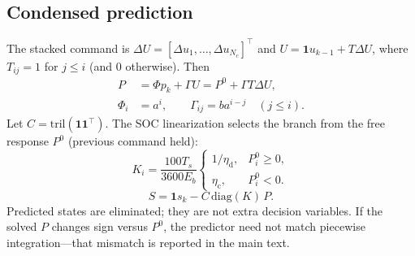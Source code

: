 \documentclass{ieeeaccess}
\begin{document}
\subsection{Condensed prediction}
The stacked command is $\Delta U=[\Delta u_1,\ldots,\Delta u_{N_c}]^\top$ and $U=\mathbf{1}u_{k-1}+T\Delta U$, where $T_{ij}=1$ for $j\le i$ (and $0$ otherwise). Then
\begin{align}
P&=\Phi p_k+\Gamma U=P^{0}+\Gamma T\Delta U,\\
\Phi_i&=a^{i},\qquad
\Gamma_{ij}=b a^{i-j}\quad (j\le i).
\end{align}
Let $C=\mathrm{tril}(\mathbf{1}\mathbf{1}^\top)$. The SOC linearization selects the branch from the free response $P^{0}$ (previous command held):
\begin{equation}
K_i=\frac{100T_s}{3600E_b}
\begin{cases}
1/\eta_{\mathrm{d}}, & P_i^{0}\ge 0,\\
\eta_{\mathrm{c}}, & P_i^{0}<0.
\end{cases}
\end{equation}
\begin{equation}
S=\mathbf{1}s_k-C\,\mathrm{diag}(K)\,P.
\end{equation}
Predicted states are eliminated; they are not extra decision variables. If the solved $P$ changes sign versus $P^{0}$, the predictor need not match piecewise integration---that mismatch is reported in the main text.
\end{document}
